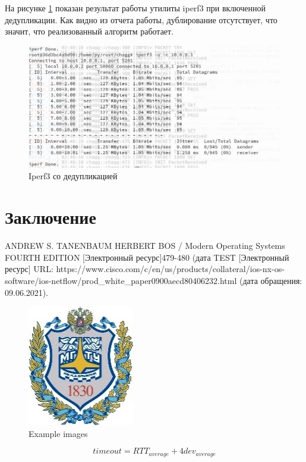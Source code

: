 \documentclass[14pt, a4paper]{extarticle}
\begin{document}
На рисунке \ref{reson} показан результат работы утилиты iperf3 при включенной дедупликации. Как видно из отчета работы, дублирование отсутствует, что значит, что реализованный алгоритм работает.
\begin{figure}[H]
	\centering
	\includegraphics[scale=0.7]{reson.jpg}
	\caption{Iperf3 со дедупликацией}
	\label{reson}
\end{figure}

\clearpage
\section*{Заключение}

\clearpage
\begin{thebibliography}{9}
	 ANDREW S. TANENBAUM
HERBERT BOS /  Modern Operating Systems FOURTH EDITION [Электронный ресурс]479-480 (дата
	 TEST [Электронный ресурс] URL: https://www.cisco.com/c/en/us/products/collateral/ios-nx-os-software/ios-netflow/prod\_white\_paper0900aecd80406232.html (дата обращения: 09.06.2021).
\end{thebibliography}

\begin{figure}[H]
	\centering
	\includegraphics[scale=0.9]{b_logo.jpg}
	\caption{Example images}
\end{figure}

\begin{equation}
	timeout =  RTT_{average} + 4 dev_{average}
\end{equation}

\begin{lstlisting}[caption=lst example]
\end{lstlisting}
\end{document}
